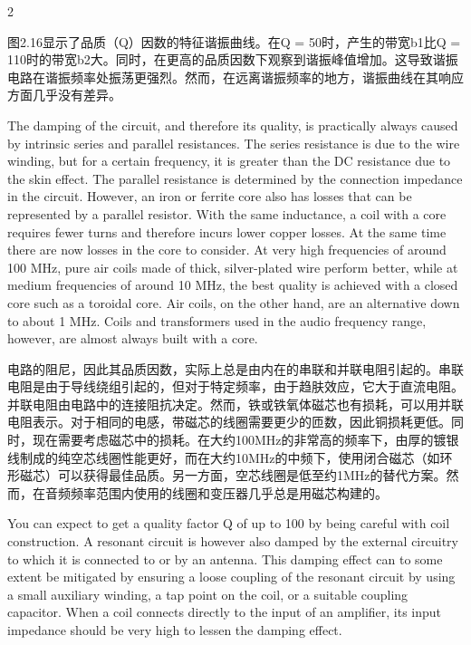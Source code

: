 \documentclass{ctexbook}
\begin{document}
\begin{paracol}{2}
\switchcolumn

图2.16显示了品质（Q）因数的特征谐振曲线。在Q = 50时，产生的带宽b1比Q = 110时的带宽b2大。同时，在更高的品质因数下观察到谐振峰值增加。这导致谐振电路在谐振频率处振荡更强烈。然而，在远离谐振频率的地方，谐振曲线在其响应方面几乎没有差异。

\switchcolumn*

The damping of the circuit, and therefore its quality, is practically always caused by intrinsic 
series and parallel resistances. The series resistance is due to the wire winding, but for a 
certain frequency, it is greater than the DC resistance due to the skin effect. The parallel 
resistance is determined by the connection impedance in the circuit. However, an iron or 
ferrite core also has losses that can be represented by a parallel resistor. With the same 
inductance, a coil with a core requires fewer turns and therefore incurs lower copper losses. 
At the same time there are now losses in the core to consider. At very high frequencies of 
around 100 MHz, pure air coils made of thick, silver-plated wire perform better, while at 
medium frequencies of around 10 MHz, the best quality is achieved with a closed core such 
as a toroidal core. Air coils, on the other hand, are an alternative down to about 1 MHz. 
Coils and transformers used in the audio frequency range, however, are almost always built 
with a core. 

\switchcolumn

电路的阻尼，因此其品质因数，实际上总是由内在的串联和并联电阻引起的。串联电阻是由于导线绕组引起的，但对于特定频率，由于趋肤效应，它大于直流电阻。并联电阻由电路中的连接阻抗决定。然而，铁或铁氧体磁芯也有损耗，可以用并联电阻表示。对于相同的电感，带磁芯的线圈需要更少的匝数，因此铜损耗更低。同时，现在需要考虑磁芯中的损耗。在大约100MHz的非常高的频率下，由厚的镀银线制成的纯空芯线圈性能更好，而在大约10MHz的中频下，使用闭合磁芯（如环形磁芯）可以获得最佳品质。另一方面，空芯线圈是低至约1MHz的替代方案。然而，在音频频率范围内使用的线圈和变压器几乎总是用磁芯构建的。

\switchcolumn*

You can expect to get a quality factor Q of up to 100 by being careful with coil construction. 
A resonant circuit is however also damped by the external circuitry to which it is connected 
to or by an antenna. This damping effect can to some extent be mitigated by ensuring a 
loose coupling of the resonant circuit by using a small auxiliary winding, a tap point on the 
coil, or a suitable coupling capacitor. When a coil connects directly to the input of an amplifier, its input impedance should be very high to lessen the damping effect. 


\end{paracol}
\end{document}

